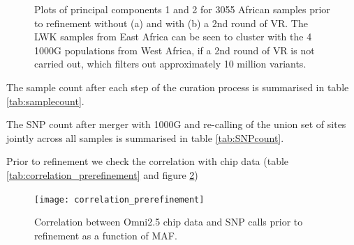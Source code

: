 \begin{figure}[h]
\begin{subfigure}{.5\textwidth}
  \caption{}
\end{subfigure}%
\caption[\gls{PCA} plot of 10 African populations.]{Plots of principal components 1 and 2 for 3055 African samples prior to refinement without (a) and with (b) a 2nd round of \gls{VR}. The \gls{LWK} samples from East Africa can be seen to cluster with the 4 \gls{1000G} populations from West Africa, if a 2nd round of \gls{VR} is not carried out, which filters out approximately 10 million variants.}
\label{fig:PCAprepostVR}
\end{figure}

The sample count after each step of the curation process is summarised in table \ref{tab:samplecount}.

The SNP count after merger with 1000G and re-calling of the union set of sites jointly across all samples is summarised in table \ref{tab:SNPcount}.

Prior to refinement we check the correlation with chip data (table \ref{tab:correlation_prerefinement} and figure \ref{fig:correlation_prerefinement})



\begin{figure}[h]
    \centering
    \texttt{[image: correlation\_prerefinement]}
    \caption{Correlation between Omni2.5 chip data and SNP calls prior to refinement as a function of \gls{MAF}.}
    \label{fig:correlation_prerefinement}
\end{figure}



